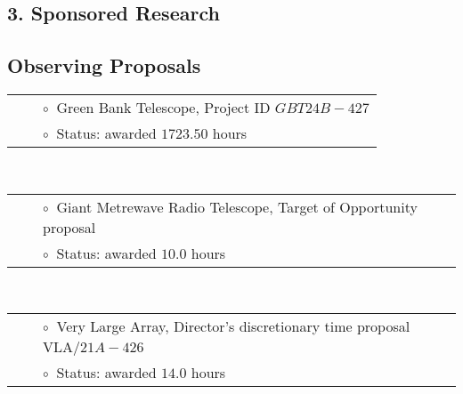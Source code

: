 \documentclass[11pt,letterpaper,sans,unicode]{moderncv}
\begin{document}
\subsection{3. Sponsored Research}




\subsection{\hspace{0.1in}Observing Proposals}
{\small
{}
\begin{tabular}{rcl}
&\hspace{0.4cm} &{\color{color1} $\circ\;\;$}Green Bank Telescope, Project ID $GBT24B-427$\\
&\hspace{0.4cm} &{\color{color1} $\circ\;\;$}Status: awarded $1723.50$ hours
\end{tabular} \\

\begin{tabular}{rcl}
&\hspace{0.4cm} &{\color{color1} $\circ\;\;$}Giant Metrewave Radio Telescope, Target of Opportunity proposal  \\
&\hspace{0.4cm} &{\color{color1} $\circ\;\;$}Status: awarded $10.0$ hours
\end{tabular} \\

\begin{tabular}{rcl}
&\hspace{0.4cm} &{\color{color1} $\circ\;\;$}Very Large Array, Director's discretionary time proposal VLA/$21A-426$ \\
&\hspace{0.4cm} &{\color{color1} $\circ\;\;$}Status: awarded $14.0$ hours
\end{tabular} \\

}
\end{document}
